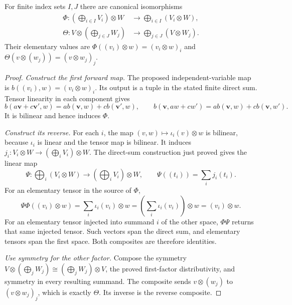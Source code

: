 \begin{theorem}\label{thm:tensor-finite-sums}
For finite index sets $I,J$ there are canonical isomorphisms
\begin{align*}
\Phi:(\bigoplus_{i\in I}V_i)\otimes W&\longrightarrow
\bigoplus_{i\in I}(V_i\otimes W),\\
\Theta:V\otimes(\bigoplus_{j\in J}W_j)&\longrightarrow
\bigoplus_{j\in J}(V\otimes W_j).
\end{align*}
Their elementary values are
$\Phi((v_i)\otimes w)=(v_i\otimes w)_i$ and
$\Theta(v\otimes(w_j))=(v\otimes w_j)_j$.
\end{theorem}
\begin{proof}
\emph{Construct the first forward map.} The proposed independent-variable
map is $b((v_i),w)=(v_i\otimes w)_i$. Its output is a tuple in the stated finite direct sum. Tensor
linearity in each component gives
\[
b(a\mathbf v+c\mathbf v',w)=ab(\mathbf v,w)+cb(\mathbf v',w),\qquad
b(\mathbf v,aw+cw')=ab(\mathbf v,w)+cb(\mathbf v,w').
\]
It is bilinear and hence induces $\Phi$.

\emph{Construct its reverse.} For each $i$, the map
$(v,w)\mapsto\iota_i(v)\otimes w$ is bilinear, because $\iota_i$ is
linear and the tensor map is bilinear. It induces
$j_i:V_i\otimes W\to(\bigoplus_iV_i)\otimes W$.
The direct-sum construction just proved gives the linear map
\[
\Psi:\bigoplus_i(V_i\otimes W)\longrightarrow(\bigoplus_iV_i)\otimes W,
\qquad \Psi((t_i))=\sum_i j_i(t_i).
\]
For an elementary tensor in the source of $\Phi$,
\[
\Psi\Phi((v_i)\otimes w)=\sum_i\iota_i(v_i)\otimes w
=\left(\sum_i\iota_i(v_i)\right)\otimes w=(v_i)\otimes w.
\]
For an elementary tensor injected into summand $i$ of the other space,
$\Phi\Psi$ returns that same injected tensor. Such vectors span the
direct sum, and elementary tensors span the first space. Both composites
are therefore identities.

\emph{Use symmetry for the other factor.} Compose the symmetry
$V\otimes(\bigoplus_jW_j)\cong(\bigoplus_jW_j)\otimes V$,
the proved first-factor distributivity, and symmetry in every resulting
summand. The composite sends $v\otimes(w_j)$ to $(v\otimes w_j)_j$,
which is exactly $\Theta$. Its inverse is the reverse composite.
\end{proof}

